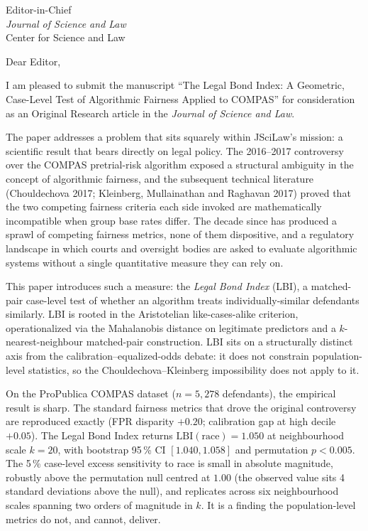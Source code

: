 \documentclass[11pt]{letter}
\begin{document}
\begin{letter}{Editor-in-Chief\\
\emph{Journal of Science and Law}\\
Center for Science and Law}

\opening{Dear Editor,}

I am pleased to submit the manuscript ``The Legal Bond Index: A
Geometric, Case-Level Test of Algorithmic Fairness Applied to COMPAS''
for consideration as an Original Research article in the
\emph{Journal of Science and Law}.

The paper addresses a problem that sits squarely within JSciLaw's
mission: a scientific result that bears directly on legal policy.
The 2016--2017 controversy over the COMPAS pretrial-risk algorithm
exposed a structural ambiguity in the concept of algorithmic
fairness, and the subsequent technical literature
(Chouldechova 2017; Kleinberg, Mullainathan and Raghavan 2017)
proved that the two competing fairness criteria each side invoked
are mathematically incompatible when group base rates differ. The
decade since has produced a sprawl of competing fairness metrics,
none of them dispositive, and a regulatory landscape in which courts
and oversight bodies are asked to evaluate algorithmic systems
without a single quantitative measure they can rely on.

This paper introduces such a measure: the \emph{Legal Bond Index}
(LBI), a matched-pair case-level test of whether an algorithm
treats individually-similar defendants similarly. LBI is rooted in
the Aristotelian like-cases-alike criterion, operationalized via the
Mahalanobis distance on legitimate predictors and a $k$-nearest-neighbour
matched-pair construction. LBI sits on a structurally distinct axis
from the calibration--equalized-odds debate: it does not constrain
population-level statistics, so the Chouldechova--Kleinberg
impossibility does not apply to it.

On the ProPublica COMPAS dataset ($n = 5{,}278$ defendants), the
empirical result is sharp. The standard fairness metrics that drove
the original controversy are reproduced exactly (FPR disparity
$+0.20$; calibration gap at high decile $+0.05$). The Legal Bond
Index returns $\mathrm{LBI}(\text{race}) = 1.050$ at neighbourhood
scale $k = 20$, with bootstrap 95\,\% CI $[1.040, 1.058]$ and
permutation $p < 0.005$. The 5\,\% case-level excess sensitivity to
race is small in absolute magnitude, robustly above the permutation
null centred at $1.00$ (the observed value sits 4 standard deviations
above the null), and replicates across six neighbourhood scales
spanning two orders of magnitude in $k$. It is a finding the
population-level metrics do not, and cannot, deliver.


\end{letter}
\end{document}
